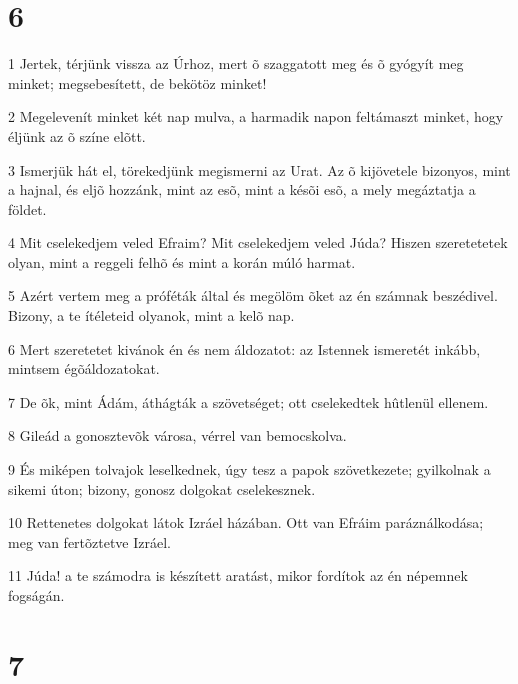 \chapter{6}

\par 1 Jertek, térjünk vissza az Úrhoz, mert õ szaggatott meg és õ gyógyít meg minket; megsebesített, de bekötöz minket!
\par 2 Megelevenít minket két nap mulva, a harmadik napon feltámaszt minket, hogy éljünk az õ színe elõtt.
\par 3 Ismerjük hát el, törekedjünk megismerni az Urat. Az õ kijövetele bizonyos, mint a hajnal, és eljõ hozzánk, mint az esõ, mint a késõi esõ, a mely megáztatja a földet.
\par 4 Mit cselekedjem veled Efraim? Mit cselekedjem veled Júda? Hiszen szeretetetek olyan, mint a reggeli felhõ és mint a korán múló harmat.
\par 5 Azért vertem meg a próféták által és megölöm õket az én számnak beszédivel. Bizony, a te ítéleteid olyanok, mint a kelõ nap.
\par 6 Mert szeretetet kivánok én és nem áldozatot: az Istennek ismeretét inkább, mintsem égõáldozatokat.
\par 7 De õk, mint Ádám, áthágták a szövetséget; ott cselekedtek hûtlenül ellenem.
\par 8 Gileád a gonosztevõk városa, vérrel van bemocskolva.
\par 9 És miképen tolvajok leselkednek, úgy tesz a papok szövetkezete; gyilkolnak a sikemi úton; bizony, gonosz dolgokat cselekesznek.
\par 10 Rettenetes dolgokat látok Izráel házában. Ott van Efráim paráználkodása; meg van fertõztetve Izráel.
\par 11 Júda! a te számodra is készített aratást, mikor fordítok az én népemnek fogságán.

\chapter{7}


